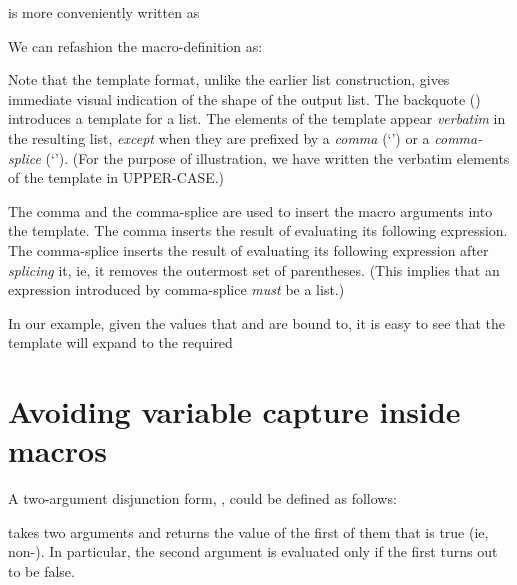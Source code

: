 
\n is more conveniently written as


\n We can refashion the  macro-definition as:


\n Note that the template format, unlike the earlier
list construction, gives immediate visual indication of
the shape of the output list.  The backquote ()
introduces a template for a list.  The elements of the
template appear {\em verbatim} in the resulting list,
{\em except} when they are prefixed by a {\em comma}
(`\q{,}') or a {\em comma-splice} (`').  (For the
purpose of illustration, we have written the verbatim
elements of the template in UPPER-CASE.)

The comma and the comma-splice are used to insert the
macro arguments into the template.  The comma inserts
the result of evaluating its following expression.  The
comma-splice inserts the result of evaluating its
following expression after {\em splicing} it, ie, it
removes the outermost set of parentheses.  (This
implies that an expression introduced by comma-splice
{\em must} be a list.)

In our example, given the values that  and
 are bound to, it is easy to see that the
template will expand to the required


\section{Avoiding variable capture inside macros}

A two-argument disjunction form, , could be
defined as follows:


\n 
{} takes two arguments and returns the value of
the first of them that is true (ie, non-).  In
particular, the second argument is evaluated only if
the first turns out to be false.


